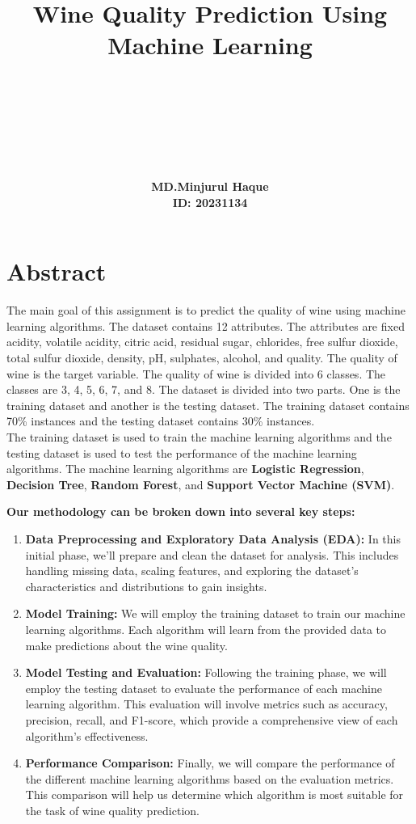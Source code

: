 \documentclass{report}
\title{%
    \textbf{Wine Quality Prediction Using Machine Learning}\\
    \text{Assignment, Summer 2023}\\
    \vspace{1cm}
    \text{Applied Statistics and Data Science}\\ \text{under}\\ \text{Weekend Masters (WM-ASDS)}

}
\author{%
    \Large \textbf{MD.Minjurul Haque} \\
    \Large \textbf{ID: 20231134}
}
\date{} %
\begin{document}
\maketitle


\pagebreak


\chapter*{\huge{Abstract}}


The main goal of this assignment is to predict the quality of wine using machine learning algorithms. The dataset contains 12 attributes.
The attributes are fixed acidity, volatile acidity, citric acid, residual sugar, chlorides, free sulfur dioxide, total sulfur dioxide, density, pH, sulphates, alcohol, and quality. 
The quality of wine is the target variable. The quality of wine is divided into 6 classes. The classes are 3, 4, 5, 6, 7, and 8. The dataset is divided into two parts. 
One is the training dataset and another is the testing dataset. The training dataset contains 70\% instances and the testing dataset contains 30\% instances.
\vspace*{0.5cm}\\
The training dataset is used to train the machine learning algorithms and the testing dataset is used to test the performance of the machine learning algorithms.
The machine learning algorithms are \textbf{Logistic Regression}, \textbf{Decision Tree}, \textbf{Random Forest}, and \textbf{Support Vector Machine (SVM)}.

\vspace*{0.5cm}
\textbf{Our methodology can be broken down into several key steps:}

\begin{enumerate}

    \item \textbf{Data Preprocessing and Exploratory Data Analysis (EDA):} In this initial phase, we'll prepare and clean the dataset for analysis. This includes handling missing data, scaling features, and exploring the dataset's characteristics and distributions to gain insights.
    \item \textbf{Model Training:} We will employ the training dataset to train our machine learning algorithms. Each algorithm will learn from the provided data to make predictions about the wine quality.
    \item \textbf{Model Testing and Evaluation:} Following the training phase, we will employ the testing dataset to evaluate the performance of each machine learning algorithm. This evaluation will involve metrics such as accuracy, precision, recall, and F1-score, which provide a comprehensive view of each algorithm's effectiveness.
    \item \textbf{Performance Comparison:} Finally, we will compare the performance of the different machine learning algorithms based on the evaluation metrics. This comparison will help us determine which algorithm is most suitable for the task of wine quality prediction.

\end{enumerate}
\end{document}
